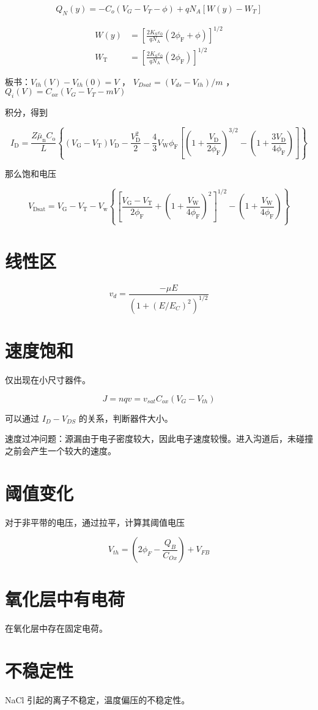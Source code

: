 \documentclass[cn,11pt,chinese,black,simple]{../elegantbook}
\begin{document}
\[Q_{N}(y)=-C_{o}\left(V_{G}-V_{T}-\phi\right)+q N_{A}\left[W(y)-W_{T}\right]\]


\[\begin{aligned}
    W(y) &=\left[\frac{2 K_{\mathrm{S}} \varepsilon_{0}}{q N_{\mathrm{A}}}\left(2 \phi_{\mathrm{F}}+\phi\right)\right]^{1 / 2} \\
    W_{\mathrm{T}} &=\left[\frac{2 K_{\mathrm{S}} \varepsilon_{0}}{q N_{\mathrm{A}}}\left(2 \phi_{\mathrm{F}}\right)\right]^{1 / 2}
\end{aligned}\]

板书：\(V_{th}(V) - V_{th}(0) = V\) ， \(V_{Dsat} = (V_{ds} - V_{th}) / m\) ，\(Q_i(V) = C_{ox} (V_G - V_T - m V)\)


积分，得到

\[I_{\mathrm{D}}=\frac{Z \bar{\mu}_{\mathrm{n}} C_{\mathrm{o}}}{L}\left\{\left(V_{\mathrm{G}}-V_{\mathrm{T}}\right) V_{\mathrm{D}}-\frac{V_{\mathrm{D}}^{2}}{2}-\frac{4}{3} V_{\mathrm{W}} \phi_{\mathrm{F}}\left[\left(1+\frac{V_{\mathrm{D}}}{2 \phi_{\mathrm{F}}}\right)^{3 / 2}-\left(1+\frac{3 V_{\mathrm{D}}}{4 \phi_{\mathrm{F}}}\right)\right]\right\}\]

那么饱和电压

\[V_{\mathrm{Dsat}}=V_{\mathrm{G}}-V_{\mathrm{T}}-V_{\mathrm{w}}\left\{\left[\frac{V_{\mathrm{G}}-V_{\mathrm{T}}}{2 \phi_{\mathrm{F}}}+\left(1+\frac{V_{\mathrm{W}}}{4 \phi_{\mathrm{F}}}\right)^{2}\right]^{1 / 2}-\left(1+\frac{V_{\mathrm{W}}}{4 \phi_{\mathrm{F}}}\right)\right\}\]

\section{线性区}

\[v_d = \frac{-\mu E}{(1+(E/E_C)^2)^{1/2}}\]



\section{速度饱和}

仅出现在小尺寸器件。

\[J = nqv = v_{sat} C_{ox} (V_G - V_{th})\] 

可以通过 \(I_D - V_{DS}\) 的关系，判断器件大小。

速度过冲问题：源漏由于电子密度较大，因此电子速度较慢。进入沟道后，未碰撞之前会产生一个较大的速度。

\section{阈值变化}

对于非平带的电压，通过拉平，计算其阈值电压

\[V_{th} = (2 \phi_F - \frac{Q_B}{C_{Ox}}) + V_{FB}\]

\section{氧化层中有电荷}

在氧化层中存在固定电荷。


\section{不稳定性}

NaCl 引起的离子不稳定，温度偏压的不稳定性。
\let\chapname\undefined
\ifx\mainclass\undefined
\end{document}

